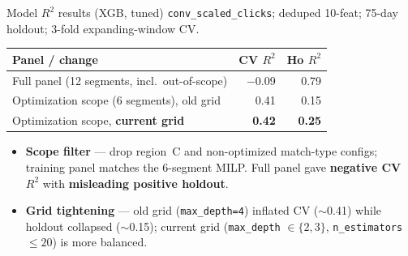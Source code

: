 \documentclass[11pt]{beamer}
\begin{document}
\begin{frame}{Model $R^2$ results (XGB, tuned)}
  \footnotesize
  \texttt{conv\_scaled\_clicks}; deduped 10-feat; 75-day holdout; 3-fold expanding-window CV.

  \vspace{0.5em}
  \begin{tabular}{@{}lrr@{}}
    \toprule
    Panel / change & CV $R^2$ & Ho $R^2$ \\
    \midrule
    Full panel (12 segments, incl.\ out-of-scope) & $-$0.09 & 0.79 \\
    Optimization scope (6 segments), old grid & 0.41 & 0.15 \\
    Optimization scope, \textbf{current grid} & \textbf{0.42} & \textbf{0.25} \\
    \bottomrule
  \end{tabular}

  \vspace{0.5em}
  \begin{itemize}
    \item \textbf{Scope filter} --- drop region~C and non-optimized match-type configs; training panel matches the 6-segment MILP. Full panel gave \textbf{negative CV $R^2$} with \textbf{misleading positive holdout}.
    \item \textbf{Grid tightening} --- old grid (\texttt{max\_depth=4}) inflated CV ($\sim$0.41) while holdout collapsed ($\sim$0.15); current grid (\texttt{max\_depth} $\in\{2,3\}$, \texttt{n\_estimators} $\leq 20$) is more balanced.
  \end{itemize}
  \normalsize
\end{frame}
\end{document}
